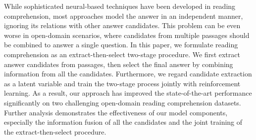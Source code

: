 While sophisticated neural-based techniques have been developed in reading comprehension, most approaches model the answer in an independent manner, ignoring its relations with other answer candidates. This problem can be even worse in open-domain scenarios, where candidates from multiple passages should be combined to answer a single question. In this paper, we formulate reading comprehension as an extract-then-select two-stage procedure. We first extract answer candidates from passages, then select the final answer by combining information from all the candidates. Furthermore, we regard candidate extraction as a latent variable and train the two-stage process jointly with reinforcement learning. As a result, our approach has improved the state-of-the-art performance significantly on two challenging open-domain reading comprehension datasets. Further analysis demonstrates the effectiveness of our model components, especially the information fusion of all the candidates and the joint training of the extract-then-select procedure.
